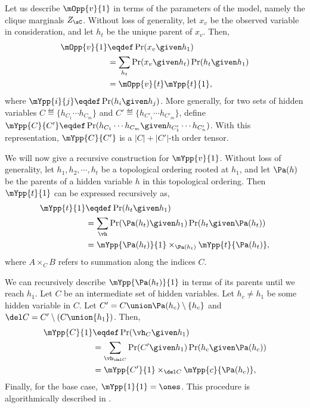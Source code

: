 Let us describe $\mOpp{v}{1}$ in terms of the parameters of the model,
  namely the clique marginals $Z_\sC$.
Without loss of generality, let $x_v$ be the observed variable in
  consideration, and let $h_t$ be the unique parent of $x_v$.
Then, 
\begin{align*}
  \mOpp{v}{1} &\eqdef \Pr( x_v \given h_1 )  \\
              &= \sum_{h_t} \Pr( x_v \given h_t ) \Pr( h_t \given h_1 ) \\
              &= \mOpp{v}{t} \mYpp{t}{1},
\end{align*}
where $\mYpp{i}{j} \eqdef \Pr( h_i \given h_j )$. 
More generally, for two sets of hidden variables $C \eqdef \{h_{C_1}
\cdots h_{C_m} \}$ and $C' \eqdef \{h_{C'_1} \cdots h_{C'_m} \}$, 
define $\mYpp{C}{C'} \eqdef \Pr( h_{C_1} \cdots h_{C_m} \given h_{C'_1}
\cdots h_{C'_n} )$. 
With this representation, $\mYpp{C}{C'}$ is a $|C| + |C'|$-th order
tensor.
  
We will now give a recursive construction for $\mYpp{v}{1}$.
Without loss of generality, let $h_1, h_2, \cdots, h_t$ be a topological
  ordering rooted at $h_1$,
and let $\Pa(h)$ be the parents of a hidden variable $h$ in
  this topological ordering.
Then $\mYpp{t}{1}$ can be expressed recursively as,
\begin{align*}
  \mYpp{t}{1} &\eqdef \Pr( h_t \given h_1 )  \\
  &= \sum_{\vh} \Pr( \Pa(h_t) \given h_1 ) \Pr( h_t \given \Pa(h_t) ) \\
  &= \mYpp{ \Pa(h_t) }{1} \times_{\Pa(h_t)} \mYpp{t}{\Pa(h_t)},
\end{align*}
where $A \times_{C} B$ refers to summation along the indices $C$.

We can recursively describe $\mYpp{ \Pa(h_t) }{1}$ in terms of its
  parents until we reach $h_1$.
Let $C$ be an intermediate set of hidden variables. Let $h_c \neq h_1$
  be some hidden variable in $C$. 
Let $C' = C \union \Pa(h_c) \setminus \{h_c\}$ and $\del C = C'
  \setminus (C \union \{h_1\})$.
Then,
\begin{align*}
  \mYpp{C}{1} &\eqdef \Pr( \vh_C \given h_1 )  \\
  &= \sum_{\vh_{\del C}} \Pr( C' \given h_1 ) \Pr( h_c \given \Pa(h_c) ) \\
  &= \mYpp{ C' }{ 1 } \times_{\del C} \mYpp{c}{\Pa(h_c)},
\end{align*}
Finally, for the base case, $\mYpp{1}{1} = \ones$.
This procedure is algorithmically described in .

